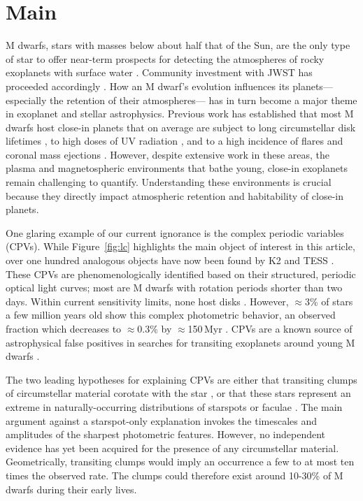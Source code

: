 \documentclass{nature3}
\begin{document}

\section{Main}
\label{sec:main}

M dwarfs, stars with masses below about half that of the Sun, are the
only type of star to offer near-term prospects for detecting the
atmospheres of rocky exoplanets with surface water \cite{NAP26141}.
Community investment with JWST has proceeded accordingly
\cite{Redfield2024,TRAPPIST1JWSTCommunityInitiative2024}.  How an M
dwarf's evolution influences its planets---especially the retention of
their atmospheres--- has in turn become a major theme in
exoplanet and stellar astrophysics.  Previous work has established
that most M dwarfs host close-in planets \cite{Dressing2015} that 
on average are subject to long circumstellar disk lifetimes
\cite{Ribas2015}, to high doses of UV radiation \cite{France2016},
and to a high incidence of flares and coronal mass ejections
\cite{Gunther2020}.  However, despite extensive work in these areas,
the plasma and magnetospheric environments that bathe young, close-in
exoplanets remain challenging to quantify.
Understanding these environments is crucial because they directly
impact atmospheric retention and habitability of close-in planets.

One glaring example of our current ignorance is the complex periodic
variables (CPVs).  While Figure~\ref{fig:lc} highlights the main
object of interest in this article, over one hundred analogous objects
have now been found by K2 and TESS
\cite{Rebull2016,Stauffer2017,Rebull2018,Zhan2019,Rebull2020,Bouma2024}.
These CPVs are phenomenologically identified based on their
structured, periodic optical light curves; most are M dwarfs with
rotation periods shorter than two days.  Within current sensitivity
limits, none host disks \cite{Stauffer2017,Bouma2024}.
However, $\approx$3\% of stars a few million years old show this complex
photometric behavior, an observed fraction which decreases to $\approx$0.3\% by
$\approx$150\,Myr \cite{Rebull2020}.
CPVs are a known source of astrophysical false positives in searches for
transiting exoplanets around young M dwarfs
\cite{vanEyken2012,Johns-Krull2016,Bouma2020}.

The two leading hypotheses for explaining CPVs are either that
transiting clumps of circumstellar material corotate with the star
\cite{Stauffer2017,Gunther2022,Bouma2024}, or that these stars
represent an extreme in naturally-occurring distributions of starspots
or faculae \cite{Koen2021}.  The main argument against a starspot-only
explanation invokes the timescales and amplitudes of the sharpest
photometric features.  However, no independent evidence has yet been
acquired for the presence of any circumstellar material.
Geometrically, transiting clumps would imply an occurrence a few to at
most ten times the observed rate.  The clumps could therefore exist
around 10-30\% of M dwarfs during their early lives.
\end{document}

